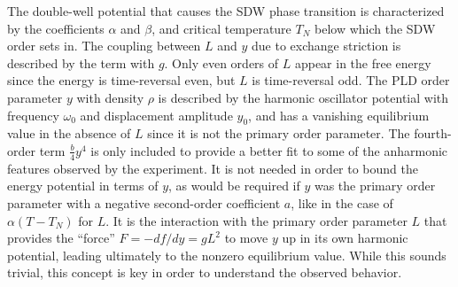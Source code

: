 The double-well potential that causes the SDW phase transition is characterized by the coefficients $\alpha$ and $\beta$,  and critical temperature $T_N$ below which the SDW order sets in.
The coupling between $L$ and $y$ due to exchange striction is described by the term with $g$.
Only even orders of $L$ appear in the free energy since the energy is time-reversal even, but $L$ is time-reversal odd.
The PLD order parameter $y$ with density $\rho$ is described by the harmonic oscillator potential with frequency $\omega_0$ and displacement amplitude $y_0$, and has a vanishing equilibrium value in the absence of $L$ since it is not the primary order parameter.
The fourth-order term $\frac{b}{4}y^4$ is only included to provide a better fit to some of the anharmonic features observed by the experiment.
It is not needed in order to bound the energy potential in terms of $y$, as would be required if $y$ was the primary order parameter with a negative second-order coefficient $a$, like in the case of $\alpha(T-T_N)$ for $L$.
It is the interaction with the primary order parameter $L$ that provides the ``force'' $F = -df/dy = gL^2$ to move $y$ up in its own harmonic potential, leading ultimately to the nonzero equilibrium value.
While this sounds trivial, this concept is key in order to understand the observed behavior.

